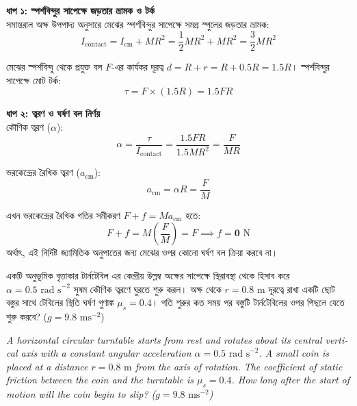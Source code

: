 \documentclass[12pt, a4paper]{article}
\begin{document}
\begin{tcolorbox}[solutionbox={সমাধান (Solution)}]
    \noindent
    \textbf{ধাপ ১: স্পর্শবিন্দুর সাপেক্ষে জড়তার ভ্রামক ও টর্ক} \\
    সমান্তরাল অক্ষ উপপাদ্য অনুসারে মেঝের স্পর্শবিন্দুর সাপেক্ষে সমগ্র স্পুলের জড়তার ভ্রামক:
    \[ I_{\text{contact}} = I_{\text{cm}} + M R^2 = \frac{1}{2} M R^2 + M R^2 = \frac{3}{2} M R^2 \]
    
    মেঝের স্পর্শবিন্দু থেকে প্রযুক্ত বল $F$-এর কার্যকর দূরত্ব $d = R + r = R + 0.5R = 1.5R$। স্পর্শবিন্দুর সাপেক্ষে মোট টর্ক:
    \[ \tau = F \times (1.5R) = 1.5 F R \]
    
    \vspace{0.5em}
    \noindent\textbf{ধাপ ২: ত্বরণ ও ঘর্ষণ বল নির্ণয়} \\
    কৌণিক ত্বরণ ($\alpha$):
    \[ \alpha = \frac{\tau}{I_{\text{contact}}} = \frac{1.5 F R}{1.5 M R^2} = \frac{F}{M R} \]
    
    ভরকেন্দ্রের রৈখিক ত্বরণ ($a_{\text{cm}}$):
    \[ a_{\text{cm}} = \alpha R = \frac{F}{M} \]
    
    এখন ভরকেন্দ্রের রৈখিক গতির সমীকরণ $F + f = M a_{\text{cm}}$ হতে:
    \[ F + f = M \left(\frac{F}{M}\right) = F \implies f = \mathbf{0}\text{ N} \]
    অর্থাৎ, এই নির্দিষ্ট জ্যামিতিক অনুপাতের জন্য মেঝের ওপর কোনো ঘর্ষণ বল ক্রিয়া করবে না।
\end{tcolorbox}

\newpage

\begin{tcolorbox}[questionbox={প্রশ্ন (Question) 17}]
    \noindent
    একটি অনুভূমিক বৃত্তাকার টার্নটেবিল এর কেন্দ্রীয় উল্লম্ব অক্ষের সাপেক্ষে স্থিরাবস্থা থেকে হিসাব করে $\alpha = 0.5\text{ rad s}^{-2}$ সুষম কৌণিক ত্বরণে ঘুরতে শুরু করল। অক্ষ থেকে $r = 0.8\text{ m}$ দূরত্বে রাখা একটি ছোট বস্তুর সাথে টেবিলের স্থিতি ঘর্ষণ গুণাঙ্ক $\mu_s = 0.4$। গতি শুরুর কত সময় পর বস্তুটি টার্নটেবিলের ওপর পিছলে যেতে শুরু করবে? ($g = 9.8\text{ ms}^{-2}$)
    
    \vspace{0.8em}
    \begin{english}
    \noindent\textit{\color{darkgray}
    A horizontal circular turntable starts from rest and rotates about its central vertical axis with a constant angular acceleration $\alpha = 0.5\text{ rad s}^{-2}$. A small coin is placed at a distance $r = 0.8\text{ m}$ from the axis of rotation. The coefficient of static friction between the coin and the turntable is $\mu_s = 0.4$. How long after the start of motion will the coin begin to slip? ($g = 9.8\text{ ms}^{-2}$)
    }
    \end{english}
\end{tcolorbox}
\end{document}
